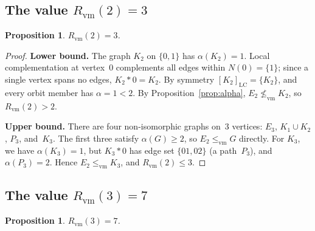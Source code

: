 \documentclass[11pt]{amsart}
\newtheorem{proposition}[theorem]{Proposition}
\theoremstyle{definition}
\theoremstyle{remark}
\newcommand{\Rvm}{R_{\mathrm{vm}}}
\newcommand{\LC}{\mathrm{LC}}
\newcommand{\vm}{\leq_{\mathrm{vm}}}
\begin{document}
\subsection{The value $\Rvm(2)=3$}

\begin{proposition}\label{prop:Rvm2}
  $\Rvm(2) = 3$.
\end{proposition}

\begin{proof}
  \textbf{Lower bound.}
  The graph $K_2$ on $\{0,1\}$ has $\alpha(K_2)=1$.  Local
  complementation at vertex~$0$ complements all edges within
  $N(0)=\{1\}$; since a single vertex spans no edges, $K_2*0=K_2$.  By
  symmetry $[K_2]_{\LC}=\{K_2\}$, and every orbit member has
  $\alpha=1<2$.  By Proposition~\ref{prop:alpha}, $E_2\not\vm K_2$,
  so $\Rvm(2)>2$.

  \smallskip
  \textbf{Upper bound.}
  There are four non-isomorphic graphs on~$3$ vertices: $E_3$,
  $K_1\cup K_2$, $P_3$, and~$K_3$.  The first three satisfy
  $\alpha(G)\geq 2$, so $E_2\vm G$ directly.  For $K_3$, we have
  $\alpha(K_3)=1$, but $K_3*0$ has edge set $\{01,02\}$ (a
  path~$P_3$), and $\alpha(P_3)=2$.  Hence $E_2\vm K_3$, and
  $\Rvm(2)\leq 3$.
\end{proof}


\subsection{The value $\Rvm(3)=7$}

\begin{proposition}\label{prop:Rvm3}
  $\Rvm(3) = 7$.
\end{proposition}
\end{document}
